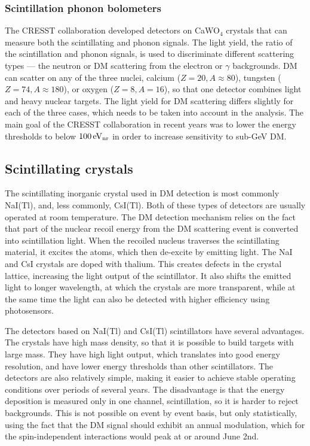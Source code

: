 \subsubsection*{Scintillation phonon bolometers} 
The CRESST collaboration developed detectors on CaWO${}_4$ crystals that can measure both the scintillating and phonon signals. The light yield, the ratio of the scintillation and phonon signals, is used to discriminate different scattering types ---  the neutron or DM scattering from the electron or $\gamma$ backgrounds. 
DM can scatter on any of the three nuclei, calcium ($Z=20, A\approx 80$), tungsten ($Z=74, A\approx 180$), or oxygen ($Z=8, A=16$), so that one detector combines light and heavy nuclear targets.  The light yield for DM scattering differs slightly for each of the three cases, which needs to be taken into account in the analysis. The main goal of the CRESST collaboration in recent years was to lower the energy thresholds to below $100\,{\rm eV}_{\rm nr}$ in order to increase sensitivity to sub-GeV DM.



\subsection{Scintillating crystals}

The scintillating inorganic crystal used in DM detection is most commonly NaI(Tl), and, less commonly, CsI(Tl). Both of these types of detectors are usually operated at room temperature. The DM detection mechanism relies on the fact that part of the nuclear recoil energy from the DM scattering event is converted into scintillation light.  When the recoiled nucleus 
 traverses the scintillating material, it excites the atoms, which then de-excite by emitting light. The NaI and CsI crystals are doped with thalium. This creates defects in the crystal lattice, increasing the light output of the scintillator. It also shifts the emitted light to longer wavelength, at which the crystals are more transparent, while at the same time the light can also be detected with higher efficiency using photosensors. 

The detectors based on NaI(Tl) and CsI(Tl) scintillators have several advantages. The crystals have high mass density, so that it is possible to build targets with large mass. They have high light output, which translates into good energy resolution, and have lower energy thresholds than other scintillators. The detectors are also relatively simple, making it easier to achieve stable operating conditions over periods of several years. The disadvantage is that the energy deposition is measured only in one channel, scintillation, so  it is harder to reject backgrounds. 
This is not possible on  event by event basis, but only statistically, using the fact that the DM signal should exhibit an annual modulation, which for the spin-independent interactions would peak at or around June 2nd. 

